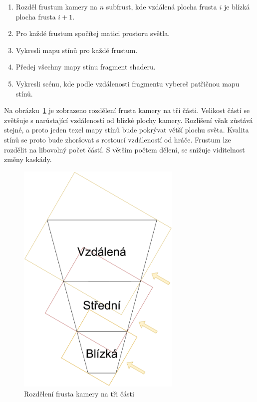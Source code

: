 \documentclass[thesis=M,czech]{FITthesis}[2019/12/23]
\begin{document}
\begin{enumerate}
\item Rozděl frustum kamery na $n$ subfrust, kde vzdálená plocha frusta $i$ je blízká plocha frusta $i + 1$.

\item Pro každé frustum spočítej matici prostoru světla.
\item Vykresli mapu stínů pro každé frustum.
\item Předej všechny mapy stínu fragment shaderu.
\item Vykresli scénu, kde podle vzdálenosti fragmentu vybereš patřičnou mapu stínů.
\end{enumerate}

Na obrázku~\ref{fig:shadows_frustum_div} je zobrazeno rozdělení frusta kamery na tři části. Velikost částí se zvětšuje s narůstající vzdáleností od blízké plochy kamery. Rozlišení však zůstává stejné, a proto jeden texel mapy stínů bude pokrývat větší plochu světa. Kvalita stínů se proto bude zhoršovat s rostoucí vzdáleností od hráče. Frustum lze rozdělit na libovolný počet částí. S větším počtem dělení, se snižuje viditelnost změny kaskády.

\begin{figure}\centering
	\includegraphics[width=0.7\textwidth]{images/shadows/frustum_div}
	\caption[Rozdělení frusta kamery na tři části]{Rozdělení frusta kamery na tři části}\label{fig:shadows_frustum_div}
\end{figure}
\end{document}
